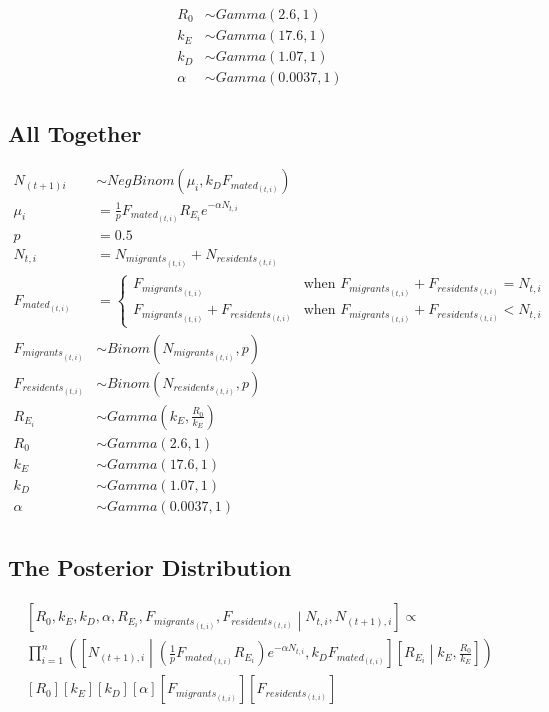 \documentclass{article}[12pt]
\begin{document}
\begin{align*}
R_0 & \sim  Gamma(2.6, 1) \\
k_E & \sim Gamma(17.6, 1) \\
k_D & \sim Gamma(1.07, 1) \\
\alpha & \sim Gamma(0.0037, 1)
\end{align*}

\subsection*{All Together}

\begin{align*}
N_{(t+1)i} & \sim NegBinom(\mu_i, k_DF_{{mated}_{(t, i)}}) \\
\mu_i & = \frac{1}{p}F_{{mated}_{(t, i)}}R_{E_i} e^{-\alpha N_{t, i}} \\
p & = 0.5 \\
N_{t, i} & = N_{{migrants}_{(t, i)}} + N_{{residents}_{(t, i)}} \\
F_{{mated}_{(t, i)}} & = \begin{cases}
	F_{{migrants}_{(t, i)}} & \text{when } F_{{migrants}_{(t, i)}} + F_{{residents}_{(t, i)}} = N_{t, i}  \\
	F_{{migrants}_{(t, i)}} + F_{{residents}_{(t, i)}} & \text{when } F_{{migrants}_{(t, i)}} + F_{{residents}_{(t, i)}} < N_{t, i}
	\end{cases} \\
F_{{migrants}_{(t, i)}} & \sim Binom(N_{{migrants}_{(t, i)}}, p) \\
F_{{residents}_{(t,i )}} & \sim Binom(N_{{residents}_{(t, i)}}, p) \\
R_{E_i} & \sim Gamma(k_E, \frac{R_0}{k_E}) \\
R_0 & \sim  Gamma(2.6, 1) \\
k_E & \sim Gamma(17.6, 1) \\
k_D & \sim Gamma(1.07, 1) \\
\alpha & \sim Gamma(0.0037, 1) \\
\end{align*}





\subsection*{The Posterior Distribution}
\begin{multline*}
\left[R_0, k_E, k_D, \alpha , R_{E_i}, F_{{migrants}_{(t, i)}}, F_{{residents}_{(t, i)}} \middle | N_{t, i}, N_{(t + 1), i} \right] \propto \\
 \prod_{i=1}^{n}\left( \left[N_{(t+1), i} \middle | \left(\frac{1}{p}F_{{mated}_{(t, i)}}R_{E_i} \right)e^{-\alpha N_{t, i}}, k_DF_{{mated}_{(t, i)}} \right] \left[ R_{E_i} \middle | k_{E}, \frac{R_{0}}{k_E} \right]   \right) \\
[R_0][k_E][k_D][\alpha][F_{{migrants}_{(t, i)}}][F_{{residents}_{(t, i)}}]
\end{multline*}
\end{document}
